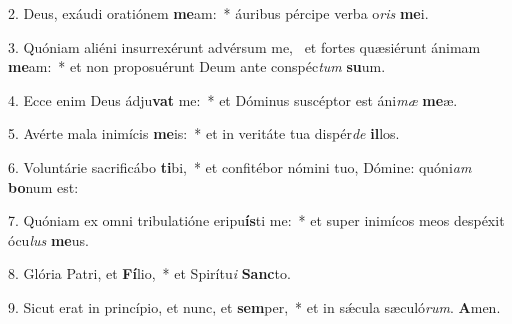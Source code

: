 2. Deus, exáudi oratiónem \textbf{me}am:~*  áuribus pércipe verba o\textit{ris} \textbf{me}i.\

3. Quóniam aliéni insurrexérunt advérsum me, \dag\  et fortes quæsiérunt ánimam \textbf{me}am:~*  et non proposuérunt Deum ante conspéc\textit{tum} \textbf{su}um.\

4. Ecce enim Deus ádju\textbf{vat} me:~*  et Dóminus suscéptor est áni\textit{mæ} \textbf{me}æ.\

5. Avérte mala inimícis \textbf{me}is:~*  et in veritáte tua dispér\textit{de} \textbf{il}los.\

6. Voluntárie sacrificábo \textbf{ti}bi,~*  et confitébor nómini tuo, Dómine: quóni\textit{am} \textbf{bo}num est:\

7. Quóniam ex omni tribulatióne eripu\textbf{ís}ti me:~*  et super inimícos meos despéxit ócu\textit{lus} \textbf{me}us.\

8. Glória Patri, et \textbf{Fí}lio,~*  et Spirítu\textit{i} \textbf{Sanc}to.\

9. Sicut erat in princípio, et nunc, et \textbf{sem}per,~*  et in sǽcula sæculó\textit{rum}. \textbf{A}men.\

